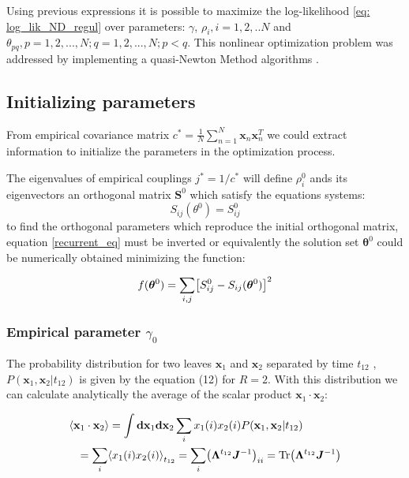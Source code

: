 \documentclass[reprint,amsmath,amssymb,superscriptaddress,showpacs,pre]{revtex4-1}
\let\originalleft\left
\let\originalright\right
\renewcommand{\left}{\mathopen{}\mathclose\bgroup\originalleft}
\renewcommand{\right}{\aftergroup\egroup\originalright}
\DeclareMathOperator{\Tr}{Tr}
\begin{document}
Using previous expressions it is possible to maximize the log-likelihood \ref{eq: log_lik_ND_regul}  over parameters: $\gamma$, $\rho_i, i = 1,2, .. N $ and $\theta_ {pq}, p = 1,2, ..., N; q = 1,2,..., N; p <q $. This nonlinear optimization problem was addressed by implementing a quasi-Newton Method algorithms \cite{NLopt}.
\subsection{Initializing parameters}
From empirical covariance matrix $c^*=\frac{1}{N}\sum_{n=1}^{N}\mathbf{x}_n \mathbf{x}_n^T$ we could extract information  to  initialize the parameters in the optimization process. 

The eigenvalues of empirical couplings $j^*=1/c^*$  will define $\rho^0_i$ ands its eigenvectors  an orthogonal matrix $\bm S^0$ which satisfy the equations systems:
\begin{equation}
S_{ij}(\theta^0)=S^0_{ij}
\label{recurrent_eq}
\end{equation}
to find the orthogonal parameters which reproduce the initial orthogonal matrix, equation \ref{recurrent_eq} must be inverted or equivalently the solution set $\bm \theta^0$ could be numerically obtained minimizing the function:

\begin{equation}
f(\bm \theta^0)=\sum_{i,j}\left[ S^0_{ij}-S_{ij}(\bm \theta^0)\right] ^2
\label{obtain_theta0}
\end{equation}

\subsubsection{Empirical parameter $\gamma_0$}
The probability distribution for two leaves $\mathbf{x}_1$ and  $\mathbf{x}_2$  separated by time $t_{12}$ , $P(\mathbf{x}_1,\mathbf{x}_2|t_{12})$ is given by the equation (12) for $R=2$. With this distribution we can calculate analytically the average of the scalar product $\mathbf{x}_1\cdot\mathbf{ x}_2$:

\begin{eqnarray}
\nonumber
\lefteqn{\left\langle \mathbf{x}_1\cdot\mathbf{ x}_2\right\rangle = \int \mathbf{dx}_1 \mathbf{dx}_2 \sum_{i} x_1(i) x_2(i)  P(\mathbf{ x}_1,\mathbf{ x}_2|t_{12})}\\\nonumber&&=\sum_{i} \left\langle  x_1(i) x_2(i)\right\rangle_{t_{12}}
=\sum_{i} \left( \bm \Lambda^{t_{12}} \bm J^{-1}\right)_{ii}=\Tr \left(\bm \Lambda^{t_{12}} \bm J^{-1} \right)  
\end{eqnarray}
\end{document}
